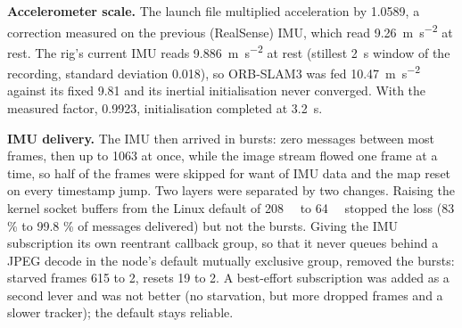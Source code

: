 \documentclass[11pt,a4paper,notitlepage]{report}
\begin{document}
\begin{table}[htbp]
\centering
\caption{Stereo-inertial runs on  at replay rate 0.5,
GPU front end on, loop closing on, one run per row. ``Starved'' frames are frames
skipped because fewer than two IMU samples had arrived for them. Source:
.}
\label{tab:gpu-inertial}
\small
{}
\end{table}

\textbf{Accelerometer scale.} The launch file multiplied acceleration by 1.0589,
a correction measured on the previous (RealSense) IMU, which read \SI{9.26}{\metre\per\second\squared}
at rest. The rig's current IMU reads \SI{9.886}{\metre\per\second\squared} at rest
(stillest \SI{2}{\second} window of the recording, standard deviation 0.018), so
ORB-SLAM3 was fed \SI{10.47}{\metre\per\second\squared} against its fixed
\SI{9.81}{} and its inertial initialisation never converged. With the measured
factor, 0.9923, initialisation completed at \SI{3.2}{\second}.

\textbf{IMU delivery.} The IMU then arrived in bursts: zero messages between most
frames, then up to 1063 at once, while the image stream flowed one frame at a time,
so half of the frames were skipped for want of IMU data and the map reset on every
timestamp jump. Two layers were separated by two changes. Raising the kernel socket
buffers from the Linux default of \SI{208}{\kibi\byte} to \SI{64}{\mebi\byte}
stopped the loss (83 \% to 99.8 \% of messages delivered) but not the bursts.
Giving the IMU subscription its own reentrant callback group, so that it never
queues behind a JPEG decode in the node's default mutually exclusive group, removed
the bursts: starved frames 615 to 2, resets 19 to 2. A best-effort subscription was
added as a second lever and was not better (no starvation, but more dropped frames
and a slower tracker); the default stays reliable.
\end{document}
